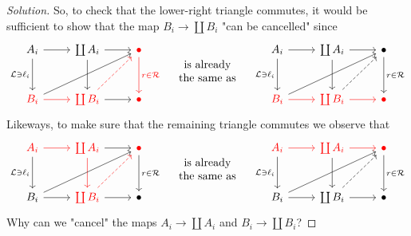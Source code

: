 \documentclass{article}
\numberwithin{equation}{section}
\newcommand{\Lc}{\mathcal{L}}
\newcommand{\Rc}{\mathcal{R}}
\begin{document}
\begin{proof}[Solution]
	So, to check that the lower-right triangle commutes, it would be sufficient to show that the map $B_i\to\coprod B_i$ "can be cancelled" since
	\[\begin{tikzcd}[row sep=large]
		A_i\arrow[r]\arrow[d,"\Lc\ni\ell_i",swap]&\coprod A_i\arrow[d]\arrow[r]&{\color{red}\bullet}\arrow[d,"r\in\Rc",red]\\
		{\color{red}B_i}\arrow[r,red]\arrow[rru]&{\color{red}\coprod B_i}\arrow[r]\arrow[ur,dashed,red]&{\color{red}\bullet}
	\end{tikzcd}\quad
	\begin{array}{c}
		\text{is already}\\
		\text{the same as}
	\end{array}\quad
	\begin{tikzcd}[row sep=large]
		A_i\arrow[r]\arrow[d,"\Lc\ni\ell_i",swap]&\coprod A_i\arrow[d]\arrow[r]&\bullet\arrow[d,"r\in\Rc"]\\
		{\color{red}B_i}\arrow[r,red]\arrow[rru]&{\color{red}\coprod B_i}\arrow[r,red]\arrow[ur,dashed]&{\color{red}\bullet}
	\end{tikzcd}\]
	Likeways, to make sure that the remaining triangle commutes we observe that
	\[\begin{tikzcd}[row sep=large]
		{\color{red}A_i}\arrow[r,red]\arrow[d,"\Lc\ni\ell_i",swap]&{\color{red}\coprod A_i}\arrow[d,red]\arrow[r]&{\color{red}\bullet}\arrow[d,"r\in\Rc"]\\
		B_i\arrow[r]\arrow[rru]&{\color{red}\coprod B_i}\arrow[r]\arrow[ur,dashed,red]&\bullet
	\end{tikzcd}\quad
	\begin{array}{c}
		\text{is already}\\
		\text{the same as}
	\end{array}
	\quad
	\begin{tikzcd}[row sep=large]
		{\color{red}A_i}\arrow[r,red]\arrow[d,"\Lc\ni\ell_i",swap]&{\color{red}\coprod A_i}\arrow[d]\arrow[r,red]&{\color{red}\bullet}\arrow[d,"r\in\Rc"]\\
		B_i\arrow[r]\arrow[rru]&\coprod B_i\arrow[r]\arrow[ur,dashed]&\bullet
	\end{tikzcd}\]
	{\color{magenta}Why can we "cancel" the maps $A_i\to\coprod A_i$ and $B_i\to\coprod B_i$?}
\end{proof}
\end{document}
